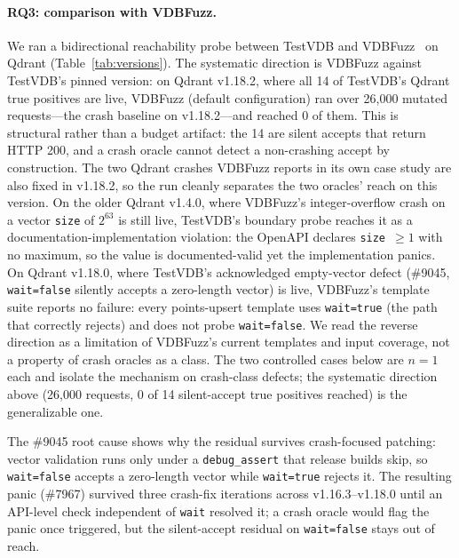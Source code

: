 \documentclass[sigconf]{acmart}
\begin{document}
\paragraph{RQ3: comparison with VDBFuzz.}
We ran a bidirectional reachability probe between TestVDB and VDBFuzz~\cite{vdbfuzz26} on Qdrant (Table~\ref{tab:versions}). The systematic direction is VDBFuzz against TestVDB's pinned version: on Qdrant v1.18.2, where all 14 of TestVDB's Qdrant true positives are live, VDBFuzz (default configuration) ran over 26{,}000 mutated requests---the crash baseline on v1.18.2---and reached 0 of them. This is structural rather than a budget artifact: the 14 are silent accepts that return HTTP 200, and a crash oracle cannot detect a non-crashing accept by construction. The two Qdrant crashes VDBFuzz reports in its own case study are also fixed in v1.18.2, so the run cleanly separates the two oracles' reach on this version. On the older Qdrant v1.4.0, where VDBFuzz's integer-overflow crash on a vector \texttt{size} of $2^{63}$ is still live, TestVDB's boundary probe reaches it as a documentation-implementation violation: the OpenAPI declares \texttt{size}~$\geq 1$ with no maximum, so the value is documented-valid yet the implementation panics. On Qdrant v1.18.0, where TestVDB's acknowledged empty-vector defect (\#9045, \texttt{wait=false} silently accepts a zero-length vector) is live, VDBFuzz's template suite reports no failure: every points-upsert template uses \texttt{wait=true} (the path that correctly rejects) and does not probe \texttt{wait=false}. We read the reverse direction as a limitation of VDBFuzz's current templates and input coverage, not a property of crash oracles as a class. The two controlled cases below are $n{=}1$ each and isolate the mechanism on crash-class defects; the systematic direction above (26{,}000 requests, 0 of 14 silent-accept true positives reached) is the generalizable one.

The \#9045 root cause shows why the residual survives crash-focused patching: vector validation runs only under a \texttt{debug\_assert} that release builds skip, so \texttt{wait=false} accepts a zero-length vector while \texttt{wait=true} rejects it. The resulting panic (\#7967) survived three crash-fix iterations across v1.16.3--v1.18.0 until an API-level check independent of \texttt{wait} resolved it; a crash oracle would flag the panic once triggered, but the silent-accept residual on \texttt{wait=false} stays out of reach.
\end{document}
